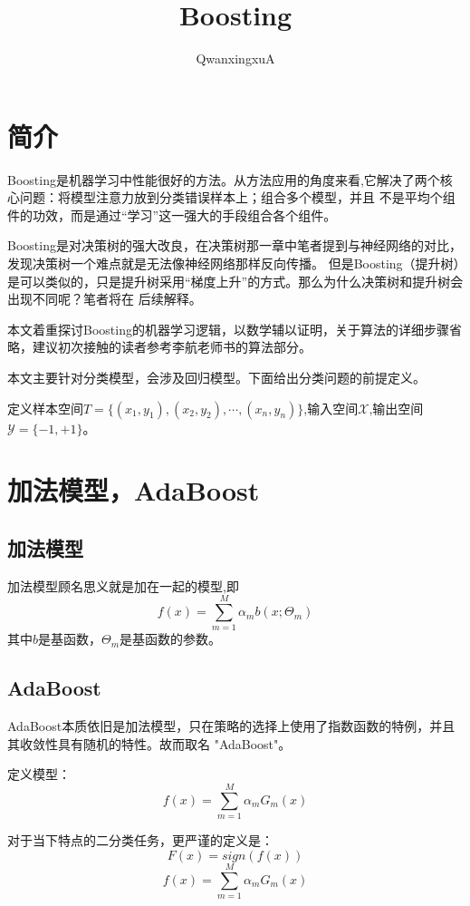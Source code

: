 \documentclass{article}
\title{Boosting}
\author{QwanxingxuA}
\begin{document}
\maketitle
    \section{简介}
        Boosting是机器学习中性能很好的方法。从方法应用的角度来看,它解决了两个核心问题：将模型注意力放到分类错误样本上；组合多个模型，并且
        不是平均个组件的功效，而是通过“学习”这一强大的手段组合各个组件。

        Boosting是对决策树的强大改良，在决策树那一章中笔者提到与神经网络的对比，发现决策树一个难点就是无法像神经网络那样反向传播。
        但是Boosting（提升树）是可以类似的，只是提升树采用“梯度上升”的方式。那么为什么决策树和提升树会出现不同呢？笔者将在
        后续解释。

        本文着重探讨Boosting的机器学习逻辑，以数学辅以证明，关于算法的详细步骤省略，建议初次接触的读者参考李航老师书的算法部分。

        本文主要针对分类模型，会涉及回归模型。下面给出分类问题的前提定义。

        定义样本空间$T=\{(x_1,y_1),(x_2,y_2),\cdots,(x_n,y_n)\}$,输入空间$\mathcal{X}$,输出空间$\mathcal{Y}=\{-1,+1\}$。

    \section{加法模型，AdaBoost}
        \subsection{加法模型}
            加法模型顾名思义就是加在一起的模型,即
            \[f(x)=\sum_{m=1}^{M}\alpha_mb(x;\varTheta_m )\]
            其中$b$是基函数，$\varTheta_m$是基函数的参数。

        \subsection{AdaBoost}
            AdaBoost本质依旧是加法模型，只在策略的选择上使用了指数函数的特例，并且其收敛性具有随机的特性。故而取名
            "AdaBoost"。

            定义模型：
            \[f(x)=\sum_{m=1}^{M}\alpha_mG_m(x)\]

            对于当下特点的二分类任务，更严谨的定义是：
            \[F(x)=sign(f(x))\]
            \[f(x)=\sum_{m=1}^{M}\alpha_mG_m(x)\]
\end{document}
